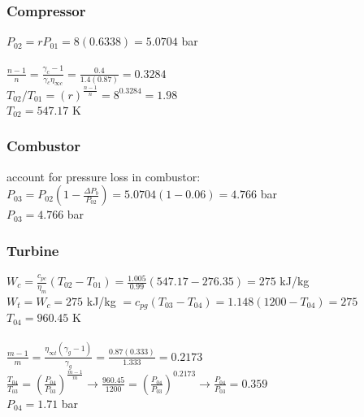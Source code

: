 \documentclass{article}
\begin{document}
\subsubsection*{Compressor}
$P_{02}=rP_{01}=8(0.6338)=5.0704$ bar \\\\
$\frac{n-1}{n}=\frac{\gamma_c-1}{\gamma_c\eta_{\infty c}}=\frac{0.4}{1.4(0.87)}=0.3284$ \\
$T_{02}/T_{01}=(r)^\frac{n-1}{n}=8^{0.3284}=1.98$ \\
$T_{02}=547.17$ K

\subsubsection*{Combustor}
account for pressure loss in combustor: $P_{03}=P_{02}(1-\frac{\Delta P_b}{P_{02}})=
5.0704(1-0.06)=4.766$ bar \\
$P_{03}=4.766$ bar

\subsubsection*{Turbine}
$W_c=\frac{c_{pc}}{\eta_m}(T_{02}-T_{01})=\frac{1.005}{0.99}(547.17-276.35)=275$ kJ/kg \\
$W_t=W_c=275$ kJ/kg $=c_{pg}(T_{03}-T_{04})=1.148(1200-T_{04})=275$ \\
$T_{04}=960.45$ K \\\\
$\frac{m-1}{m}=\frac{\eta_{\infty t}(\gamma_g-1)}{\gamma_g}=\frac{0.87(0.333)}{1.333}=0.2173$ \\
$\frac{T_{04}}{T_{03}}=(\frac{P_{04}}{P_{03}})^\frac{m-1}{m} \rightarrow \frac{960.45}{1200}=
(\frac{P_{04}}{P_{03}})^{0.2173} \rightarrow \frac{P_{04}}{P_{03}}=0.359$ \\
$P_{04}=1.71$ bar
\end{document}
